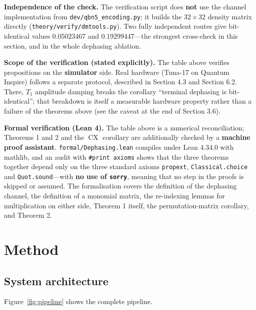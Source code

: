 \documentclass{article}
\begin{document}
\textbf{Independence of the check.} The verification script does
\textbf{not} use the channel implementation from
\texttt{dev/\allowbreak qbn5\_\allowbreak encoding.py}; it builds the \(32 \times 32\) density
matrix directly (\texttt{theory/\allowbreak verify/\allowbreak dmtools.py}). Two fully
independent routes give bit-identical values \(0.05023467\) and
\(0.19299447\)---the strongest cross-check in this section, and in the
whole dephasing ablation.

\textbf{Scope of the verification (stated explicitly).} The table above
verifies propositions on the \textbf{simulator} side. Real hardware
(Tuna-17 on Quantum Inspire) follows a separate protocol, described in
Section 4.3 and Section 6.2. There, \(T_{1}\) amplitude damping breaks
the corollary ``terminal dephasing is bit-identical''; that breakdown is
itself a measurable hardware property rather than a failure of the
theorems above (see the caveat at the end of Section 3.6).

\textbf{Formal verification (Lean 4).} The table above is a numerical
reconciliation; Theorems 1 and 2 and the \(\operatorname{CX}\) corollary
are additionally checked by a \textbf{machine proof assistant}.
\texttt{formal/\allowbreak Dephasing.lean} compiles under Lean 4.34.0 with mathlib,
and an audit with \texttt{\#print\ axioms} shows that the three theorems
together depend only on the three standard axioms \texttt{propext},
\texttt{Classical.choice} and \texttt{Quot.sound}---with \textbf{no use
of \texttt{sorry}}, meaning that no step in the proofs is skipped or
assumed. The formalisation covers the definition of the dephasing
channel, the definition of a monomial matrix, the re-indexing lemmas for
multiplication on either side, Theorem 1 itself, the permutation-matrix
corollary, and Theorem 2.

\section{Method}

\subsection{System architecture}

Figure~\ref{fig:pipeline} shows the complete pipeline.
\end{document}
